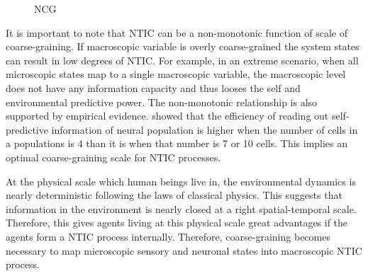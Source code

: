 \documentclass[utf8]{article}
\begin{document}
		\begin{WritingMaterials}
    		\begin{figure}
    			\caption{NCG \citep{guttenberg2016neural}}
    			\label{fig:NCG}
    		\end{figure}		
    	\end{WritingMaterials}

		It is important to note that NTIC can be a non-monotonic function of scale of coarse-graining. If macroscopic variable is overly coarse-grained the system states can result in low degrees of NTIC. For example, in an extreme scenario, when all microscopic states map to a single macroscopic variable, the macroscopic level does not have any information capacity and thus looses the self and environmental predictive power. The non-monotonic relationship is also supported by empirical evidence. \cite{sederberg2018learning} showed that the efficiency of reading out self-predictive information of neural population is higher when the number of cells in a populations is 4 than it is when that number is 7 or 10 cells. This implies an optimal coarse-graining scale for NTIC processes. %


        At the physical scale which human beings live in, the environmental dynamics is nearly deterministic following the laws of classical physics. This suggests that information in the environment is nearly closed at a right spatial-temporal scale. Therefore, this gives agents living at this physical scale great advantages if the agents form a NTIC process internally. Therefore, coarse-graining becomes necessary to map microscopic sensory and neuronal states into macroscopic NTIC process. 
        
        
\end{document}

